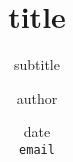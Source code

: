 \documentclass[aspectratio=169]{beamer}
\title[]{title}
\subtitle{subtitle}
\author[author]{author}
\institute[institute]{institute}
\date{date\\\small\texttt{email}}
\begin{document}
\begin{frame}
  \titlepage
\end{frame}


\end{document}
